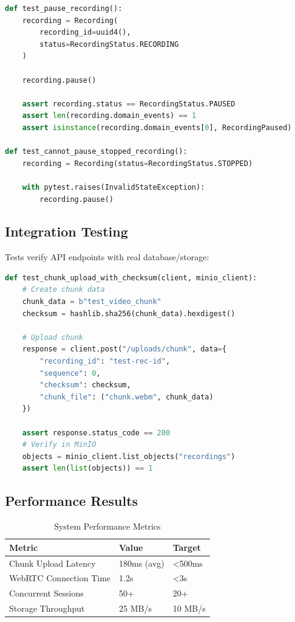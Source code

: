 \documentclass[12pt,a4paper]{article}
\begin{document}
\begin{lstlisting}[language=Python, caption=Recording Aggregate Tests, basicstyle=\ttfamily\scriptsize]
def test_pause_recording():
    recording = Recording(
        recording_id=uuid4(),
        status=RecordingStatus.RECORDING
    )

    recording.pause()

    assert recording.status == RecordingStatus.PAUSED
    assert len(recording.domain_events) == 1
    assert isinstance(recording.domain_events[0], RecordingPaused)

def test_cannot_pause_stopped_recording():
    recording = Recording(status=RecordingStatus.STOPPED)

    with pytest.raises(InvalidStateException):
        recording.pause()
\end{lstlisting}

\subsection{Integration Testing}

Tests verify API endpoints with real database/storage:

\begin{lstlisting}[language=Python, caption=API Integration Test, basicstyle=\ttfamily\scriptsize]
def test_chunk_upload_with_checksum(client, minio_client):
    # Create chunk data
    chunk_data = b"test_video_chunk"
    checksum = hashlib.sha256(chunk_data).hexdigest()

    # Upload chunk
    response = client.post("/uploads/chunk", data={
        "recording_id": "test-rec-id",
        "sequence": 0,
        "checksum": checksum,
        "chunk_file": ("chunk.webm", chunk_data)
    })

    assert response.status_code == 200
    # Verify in MinIO
    objects = minio_client.list_objects("recordings")
    assert len(list(objects)) == 1
\end{lstlisting}

\subsection{Performance Results}

\begin{table}[H]
\centering
\caption{System Performance Metrics}
\begin{tabular}{@{}lll@{}}
\toprule
\textbf{Metric} & \textbf{Value} & \textbf{Target} \\ \midrule
Chunk Upload Latency & 180ms (avg) & <500ms \\
WebRTC Connection Time & 1.2s & <3s \\
Concurrent Sessions & 50+ & 20+ \\
Storage Throughput & 25 MB/s & 10 MB/s \\
\bottomrule
\end{tabular}
\end{table}
\end{document}
